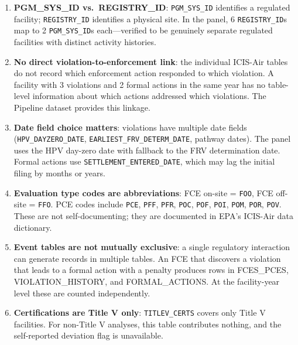 \documentclass[11pt]{article}
\begin{document}
\begin{enumerate}[nosep]
  \item \textbf{PGM\_SYS\_ID vs.\ REGISTRY\_ID}: \texttt{PGM\_SYS\_ID} identifies a regulated facility; \texttt{REGISTRY\_ID} identifies a physical site. In the panel, 6 \texttt{REGISTRY\_ID}s map to 2 \texttt{PGM\_SYS\_ID}s each---verified to be genuinely separate regulated facilities with distinct activity histories.

  \item \textbf{No direct violation-to-enforcement link}: the individual ICIS-Air tables do not record which enforcement action responded to which violation. A facility with 3 violations and 2 formal actions in the same year has no table-level information about which actions addressed which violations. The Pipeline dataset provides this linkage.

  \item \textbf{Date field choice matters}: violations have multiple date fields (\texttt{HPV\_DAYZERO\_DATE}, \texttt{EARLIEST\_FRV\_DETERM\_DATE}, pathway dates). The panel uses the HPV day-zero date with fallback to the FRV determination date. Formal actions use \texttt{SETTLEMENT\_ENTERED\_DATE}, which may lag the initial filing by months or years.

  \item \textbf{Evaluation type codes are abbreviations}: FCE on-site = \texttt{FOO}, FCE off-site = \texttt{FFO}. PCE codes include \texttt{PCE}, \texttt{PFF}, \texttt{PFR}, \texttt{POC}, \texttt{POF}, \texttt{POI}, \texttt{POM}, \texttt{POR}, \texttt{POV}. These are not self-documenting; they are documented in EPA's ICIS-Air data dictionary.

  \item \textbf{Event tables are not mutually exclusive}: a single regulatory interaction can generate records in multiple tables. An FCE that discovers a violation that leads to a formal action with a penalty produces rows in FCES\_PCES, VIOLATION\_HISTORY, and FORMAL\_ACTIONS. At the facility-year level these are counted independently.

  \item \textbf{Certifications are Title V only}: \texttt{TITLEV\_CERTS} covers only Title V facilities. For non-Title V analyses, this table contributes nothing, and the self-reported deviation flag is unavailable.
\end{enumerate}
\end{document}
